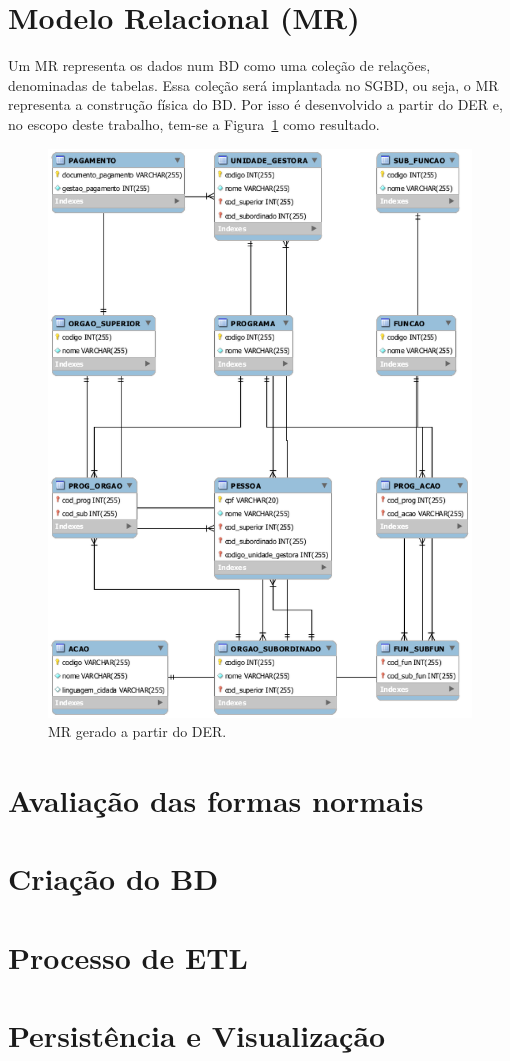 \documentclass [12pt]{article}
\begin{document}
	
	\section{Modelo Relacional (MR)}
		\label{sec:MR}
	Um MR representa os dados num BD como uma coleção de relações, denominadas de tabelas. Essa coleção será implantada no SGBD, ou seja, o MR representa a construção física do BD. Por isso é desenvolvido a partir do DER e, no escopo deste trabalho, tem-se a Figura~\ref{fig:MRgerado} como resultado.
	
	\begin{figure}[h]
		\centering
		\includegraphics[width=.8\textwidth]{Imagens/MR}
		\caption{MR gerado a partir do DER.}
		\label{fig:MRgerado}
	\end{figure}
	
	\section{Avaliação das formas normais}
		\label{sec:FormaisNormais}
		
	\section{Criação do BD}
		\label{sec:BDcreate}
		
	\section{Processo de ETL}
		\label{sec:ETL}
		
	\section{Persistência e Visualização}
		\label{sec:Per&Vis}
\end{document}
